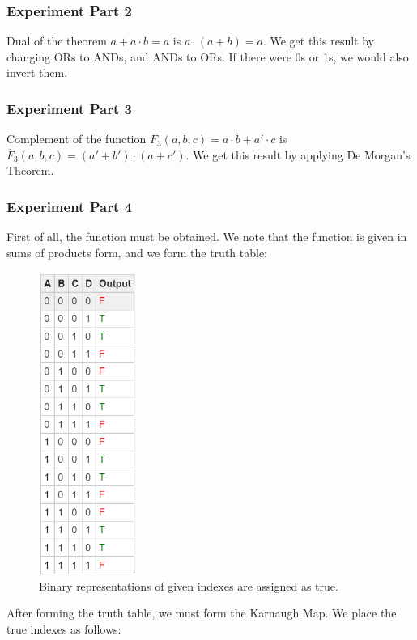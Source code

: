 \documentclass[pdftex,12pt,a4paper]{article}
\begin{document}
\subsubsection{Experiment Part 2}
Dual of the theorem \(a + a \cdot b = a\) is \(a \cdot (a + b) = a\). We get this result by changing ORs to ANDs, and ANDs to ORs. If there were 0s or 1s, we would also invert them.

\subsubsection{Experiment Part 3}
Complement of the function \(F_3(a, b, c) = a \cdot b + a' \cdot c\) is \(\overline{F}_3(a, b, c) = (a' + b') \cdot (a + c')\). We get this result by applying De Morgan's Theorem.

\subsubsection{Experiment Part 4}
First of all, the function must be obtained. We note that the function is given in sums of products form, and we form the truth table:

\begin{figure}[H]
	\centering
	\includegraphics[width=0.28\textwidth]{f4_truthtable.PNG}	
	\caption{Binary representations of given indexes are assigned as true.}
	\label{fig7}
\end{figure}

After forming the truth table, we must form the Karnaugh Map. We place the true indexes as follows:
\end{document}
